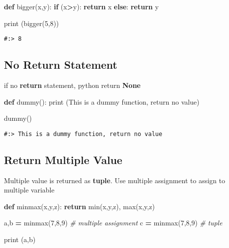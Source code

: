 \documentclass[
]{book}
\newenvironment{Shaded}{\begin{snugshade}}{\end{snugshade}}
\newcommand{\BuiltInTok}[1]{#1}
\newcommand{\CommentTok}[1]{\textcolor[rgb]{0.37,0.37,0.37}{\textit{#1}}}
\newcommand{\ControlFlowTok}[1]{\textcolor[rgb]{0.27,0.27,0.27}{\textbf{#1}}}
\newcommand{\DecValTok}[1]{\textcolor[rgb]{0.06,0.06,0.06}{#1}}
\newcommand{\KeywordTok}[1]{\textcolor[rgb]{0.27,0.27,0.27}{\textbf{#1}}}
\newcommand{\NormalTok}[1]{#1}
\newcommand{\OperatorTok}[1]{\textcolor[rgb]{0.43,0.43,0.43}{\textbf{#1}}}
\newcommand{\StringTok}[1]{\textcolor[rgb]{0.5,0.5,0.5}{#1}}
\begin{document}
\begin{Shaded}
\begin{Highlighting}[]
\KeywordTok{def}\NormalTok{ bigger(x,y):}
    \ControlFlowTok{if}\NormalTok{ (x}\OperatorTok{\textgreater{}}\NormalTok{y):}
        \ControlFlowTok{return}\NormalTok{ x}
    \ControlFlowTok{else}\NormalTok{:}
        \ControlFlowTok{return}\NormalTok{ y}
    
\BuiltInTok{print}\NormalTok{ (bigger(}\DecValTok{5}\NormalTok{,}\DecValTok{8}\NormalTok{))}
\end{Highlighting}
\end{Shaded}

\begin{verbatim}
#:> 8
\end{verbatim}

\hypertarget{no-return-statement}{%
\subsection{No Return Statement}\label{no-return-statement}}

if no \textbf{return} statement, python return \textbf{None}

\begin{Shaded}
\begin{Highlighting}[]
\KeywordTok{def}\NormalTok{ dummy():}
    \BuiltInTok{print}\NormalTok{ (}\StringTok{\textquotesingle{}This is a dummy function, return no value\textquotesingle{}}\NormalTok{)}

\NormalTok{dummy()}
\end{Highlighting}
\end{Shaded}

\begin{verbatim}
#:> This is a dummy function, return no value
\end{verbatim}

\hypertarget{return-multiple-value}{%
\subsection{Return Multiple Value}\label{return-multiple-value}}

Multiple value is returned as \textbf{tuple}. Use multiple assignment to assign to multiple variable

\begin{Shaded}
\begin{Highlighting}[]
\KeywordTok{def}\NormalTok{ minmax(x,y,z):}
    \ControlFlowTok{return} \BuiltInTok{min}\NormalTok{(x,y,z), }\BuiltInTok{max}\NormalTok{(x,y,z)}

\NormalTok{a,b }\OperatorTok{=}\NormalTok{ minmax(}\DecValTok{7}\NormalTok{,}\DecValTok{8}\NormalTok{,}\DecValTok{9}\NormalTok{)     }\CommentTok{\# multiple assignment}
\NormalTok{c   }\OperatorTok{=}\NormalTok{ minmax(}\DecValTok{7}\NormalTok{,}\DecValTok{8}\NormalTok{,}\DecValTok{9}\NormalTok{)     }\CommentTok{\# tuple}

\BuiltInTok{print}\NormalTok{ (a,b)}
\end{Highlighting}
\end{Shaded}
\end{document}

